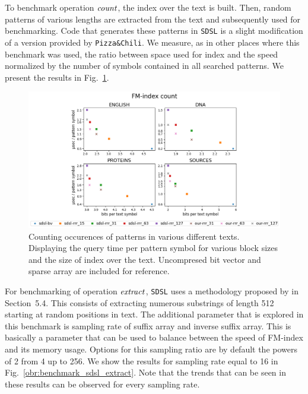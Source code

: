 To benchmark operation $\mathit{count}$, the index over the text is built. Then, random patterns of
various lengths are extracted from the text and subsequently used for benchmarking. Code
that generates these patterns in \texttt{SDSL} is a slight modification of a version provided
by \texttt{Pizza\&Chili}. We measure, as in other places where this benchmark was used, the
ratio between space used for index and the speed normalized by the number of symbols contained
in all searched patterns. We present the results in Fig.~\ref{obr:benchmark_sdsl_count}.

\begin{figure}
	\centerline{
		\includegraphics[width=\textwidth, height=0.4\textheight]{images/vysledky_sdsl_count}
	}
	\caption[TODO]{Counting occurences of patterns in various different texts. Displaying
	the query time per pattern symbol for various block sizes and the size of index over the
	text. Uncompresed bit vector and sparse array are included for reference. 
	}
	\label{obr:benchmark_sdsl_count}
\end{figure}

For benchmarking of operation $\mathit{extract}$, \texttt{SDSL} uses a methodology proposed by
\cite{ferragina2009compressed} in Section~5.4. This consists of extracting numerous
substrings of length 512 starting at random positions in text. The additional parameter
that is explored in this benchmark is sampling rate of suffix array and inverse suffix array.
This is basically a parameter that can be used to balance between the speed of FM-index and
its memory usage. Options for this sampling ratio are by default the powers of 2 from 4 up to
256. We show the results for sampling rate equal to 16 in Fig.~\ref{obr:benchmark_sdsl_extract}.
Note that the trends that can be seen in these results can be observed for every sampling rate.

